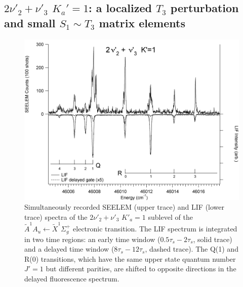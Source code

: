 \documentclass[12pt]{mitthesis}
\begin{document}







\subsection{$2\nu'_2+\nu'_3$ $K_a'\!=\!1$: a localized $T_3$
  perturbation and small $S_1 \sim T_3$ matrix elements}



\begin{figure}
  \caption{Simultaneously recorded SEELEM (upper trace) and LIF (lower
    trace) spectra of the $2\nu'_2+\nu'_3$ $K'_a\!=\!1$ sublevel of the
    $\tilde{A}^1A_u \leftarrow \tilde{X} ^1\Sigma_g^+$ electronic
    transition.  The LIF spectrum is integrated in two time regions:
    an early time window ($0.5\tau_s-2\tau_s$, solid trace) and a
    delayed time window ($8\tau_s-12\tau_s$, dashed trace).  The Q(1)
    and R(0) transitions, which have the same upper state quantum
    number $J'=1$ but different parities, are shifted to opposite
    directions in the delayed fluorescence spectrum.}
  \label{fig:spectrum-2231}
  \centering
  \vspace{1cm}
  \includegraphics[width=7in,angle=90]{acetylene-2231-q4r3.png}
\end{figure}
\end{document}
